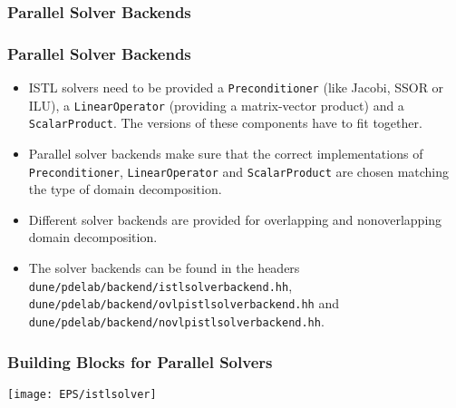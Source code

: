 \subsubsection{Parallel Solver Backends}
\begin{frame}
  \frametitle<presentation>{Parallel Solver Backends}

\begin{itemize}
\item ISTL solvers need to be provided a \lstinline!Preconditioner! (like Jacobi, SSOR or ILU), a
\lstinline!LinearOperator! (providing a matrix-vector product) and
a \lstinline!ScalarProduct!. The versions of these components have to fit together.
\item Parallel solver backends make sure that the correct implementations of
\lstinline!Preconditioner!, \lstinline!LinearOperator! and \lstinline!ScalarProduct!
are chosen matching the type of domain decomposition.
\item Different solver backends are provided for overlapping and nonoverlapping domain
decomposition.
\item The solver backends can be found in the headers \lstinline!dune/pdelab/backend/istlsolverbackend.hh!,
\lstinline!dune/pdelab/backend/ovlpistlsolverbackend.hh! and
\lstinline!dune/pdelab/backend/novlpistlsolverbackend.hh!.
\end{itemize}

\end{frame}

\begin{frame}
  \frametitle<presentation>{Building Blocks for Parallel Solvers}
  \texttt{[image: EPS/istlsolver]}
\end{frame}


